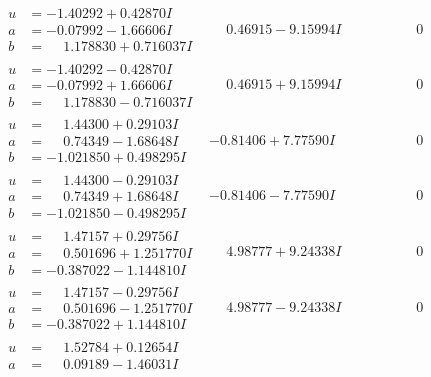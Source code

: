 \documentclass[1p]{elsarticle_modified}
\theoremstyle{definition}
\begin{document}
$$\begin{array}{c|c|c}
 \hline 
\begin{aligned}
u &= -1.40292 + 0.42870 I \\
a &= -0.07992 - 1.66606 I \\
b &= \phantom{-}1.178830 + 0.716037 I\end{aligned}
 & \phantom{-}0.46915 - 9.15994 I & \phantom{-0.000000 } 0 \\ \hline\begin{aligned}
u &= -1.40292 - 0.42870 I \\
a &= -0.07992 + 1.66606 I \\
b &= \phantom{-}1.178830 - 0.716037 I\end{aligned}
 & \phantom{-}0.46915 + 9.15994 I & \phantom{-0.000000 } 0 \\ \hline\begin{aligned}
u &= \phantom{-}1.44300 + 0.29103 I \\
a &= \phantom{-}0.74349 - 1.68648 I \\
b &= -1.021850 + 0.498295 I\end{aligned}
 & -0.81406 + 7.77590 I & \phantom{-0.000000 } 0 \\ \hline\begin{aligned}
u &= \phantom{-}1.44300 - 0.29103 I \\
a &= \phantom{-}0.74349 + 1.68648 I \\
b &= -1.021850 - 0.498295 I\end{aligned}
 & -0.81406 - 7.77590 I & \phantom{-0.000000 } 0 \\ \hline\begin{aligned}
u &= \phantom{-}1.47157 + 0.29756 I \\
a &= \phantom{-}0.501696 + 1.251770 I \\
b &= -0.387022 - 1.144810 I\end{aligned}
 & \phantom{-}4.98777 + 9.24338 I & \phantom{-0.000000 } 0 \\ \hline\begin{aligned}
u &= \phantom{-}1.47157 - 0.29756 I \\
a &= \phantom{-}0.501696 - 1.251770 I \\
b &= -0.387022 + 1.144810 I\end{aligned}
 & \phantom{-}4.98777 - 9.24338 I & \phantom{-0.000000 } 0 \\ \hline\begin{aligned}
u &= \phantom{-}1.52784 + 0.12654 I \\
a &= \phantom{-}0.09189 - 1.46031 I \\

\end{aligned}
\end{array}$$
\end{document}
